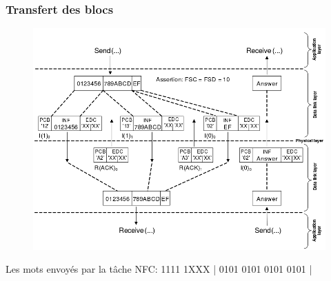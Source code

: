 \documentclass{beamer}
\begin{document}
\begin{frame}
\frametitle{Transfert des blocs}
\begin{figure}
\centering
\includegraphics[scale=0.25]{images/chaining.png}
\end{figure}
Les mots envoyés par la tâche NFC: 1111 1XXX | 0101 0101 0101 0101 |
\end{frame}

\end{document}
